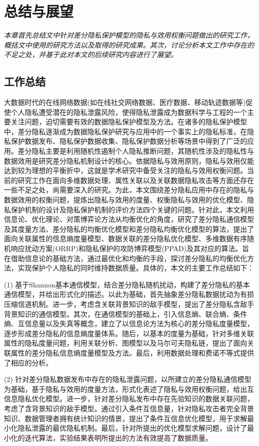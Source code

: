 \chapter{总结与展望}\label{chapter07}
{\em 本章首先总结文中针对差分隐私保护模型的隐私与效用权衡问题做出的研究工作，概括文中使用的研究方法以及取得的研究成果。其次，讨论分析本文工作中存在的不足之处，并基于此对本文的后续研究内容进行了展望。}

\section{工作总结}
大数据时代的在线网络数据(如在线社交网络数据、医疗数据、移动轨迹数据等)促使个人隐私遭受潜在的隐私泄露风险，使得隐私泄露成为数据科学与工程的一个主要关注问题，迫切需要有效的数据隐私保护模型及方法。在诸多的隐私保护模型中，差分隐私逐渐成为数据隐私保护研究与应用中的一个事实上的隐私标准，在隐私保护数据发布、隐私保护数据收集、隐私保护数据分析等场景中得到了广泛的应用。差分隐私主要是利用随机性遏制个人隐私推断问题，其随机性涉及的隐私性与数据效用是研究差分隐私机制设计的核心。依据隐私与效用原则，隐私与效用仅能达到较为理想的平衡折中，这就是学术研究中备受关注的隐私与效用权衡问题。当前的研究工作在面向多维数据处理、属性关联以及关联数据隐私攻击等方面还存在一些不足之处，尚需要深入的研究。为此，本文围绕差分隐私应用中存在的隐私与数据效用的权衡问题，提炼出隐私与效用的度量、权衡隐私与效用的优化模型、隐私保护机制的设计及隐私保护机制的评价方法四个关键的问题。针对此，本文利用信息论、优化理论、对策博弈论方法从均衡优化的角度，研究了差分隐私通信模型及其度量方法、差分隐私的均衡优化模型和差分隐私均衡优化模型的算法，提出了面向关联属性的信息熵度量模型、数据关联的差分隐私优化模型、多维数据有序随机响应扰动方案(ORRP)和隐私保护的攻防博弈模型(PPAD)及其对应的算法。旨在借助信息论的基础方法，通过最优化和均衡的手段，探讨差分隐私的均衡优化方法，实现保护个人隐私的同时维持数据质量。具体的，本文的主要工作总结如下：


(1) 基于Shannon基本通信模型，结合差分隐私随机扰动，构建了差分隐私的基本通信模型，并给出形式化的描述。以此为基础，首先抽象差分隐私数据扰动为有损压缩信道机制。进一步，考虑含关联背景知识的敌手模型，提出了差分隐私含敌手背景知识的通信模型。其次，在通信模型的基础上，引入信息熵、联合熵、条件熵、互信息量以及失真等概念，建立了以信息论方法为核心的差分隐私度量模型，逐步形成差分隐私的信息熵度量体系。随后，以基本的度量为基础，针对多维关联属性的隐私度量问题，利用关联分析、图模型以及马尔可夫隐私链，提出了面向关联属性的差分隐私信息熵度量模型及方法。最后，利用数据处理和费诺不等式提供了相应的分析。

(2) 针对差分隐私数据发布中存在的隐私泄露问题，以所建立的差分隐私通信模型为基础，基于隐私与效用的度量方法，形式化表述了隐私与效用权衡问题，给出互信息隐私优化模型。进一步，针对差分隐私发布中存在先验知识的数据关联问题，考虑了含背景知识的敌手模型。通过引入条件互信息量，针对隐私攻击者完全背景知识、数据管理者拥有统计知识的情景，提出了条件互信息优化模型，用于求解最小化隐私泄露的最优隐私机制。最后，针对所提出的优化模型求解问题，设计了最小化的迭代算法，实验结果表明所提出的方法有效提高了数据质量。


